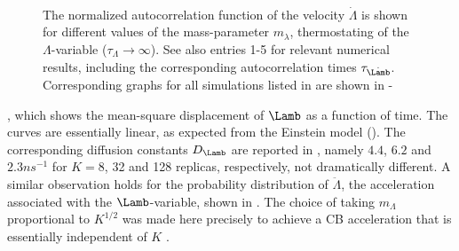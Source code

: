 \begin{figure}
    \centering
    \begin{minipage}[t]{2.2in}
        \hfill \\
  \end{minipage}%
    \begin{minipage}[t]{1.2in}
        \hfill \\
        
  \end{minipage}\\

    \caption{\footnotesize {}
%
      The normalized autocorrelation function  of the velocity $\dot{\Lambda}$
      is shown for different values of the mass-parameter $m_{\lambda}$, 
      thermostating of the $\Lambda$-variable ($\tau_{\Lambda}\rightarrow \infty$).
%
      See also  entries 1-5 for relevant numerical results, including
      the corresponding autocorrelation times $\tau_{\dot{\Lamb}}$.
%
      Corresponding graphs for all simulations listed in  are shown 
      in  - 
   }
\label{fig:acf}
\end{figure}

%
%



, which shows the mean-square displacement 
of $\Lamb$ as a function of time. The curves are
essentially linear, as expected from the Einstein model (). 
The corresponding diffusion constants $D_{\Lamb}$ are reported in , namely 
$4.4$, $6.2$ and $2.3\unit{ns^{-1}}$ 
for $K=8$, 32 and 128 replicas, respectively, \ie{} not dramatically different.
A similar observation holds for the probability distribution of $\ddot{\Lambda}$, the acceleration associated with the $\Lamb$-variable, shown in .
The choice of taking $m_{\Lambda}$ proportional to $K^{1/2}$ 
was made here precisely to achieve a CB acceleration that is essentially independent of $K$ .

